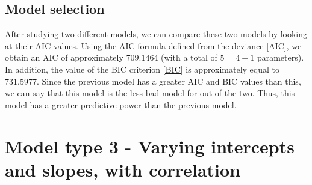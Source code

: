 \documentclass{article}
\begin{document}
\subsection{Model selection}
After studying two different models, we can compare these two models by looking at their AIC values.
Using the AIC formula defined from the deviance \eqref{AIC}, we obtain an AIC of approximately $709.1464$ (with a total of $5=4+1$ parameters). In addition, the value of the BIC criterion \eqref{BIC} is approximately equal to $731.5977$.
Since the previous model has a greater AIC and BIC values than this, we can say that this model is the less bad model for out of the two. Thus, this model has a greater predictive power than the previous model.



\section{Model type 3 - Varying intercepts and slopes, with correlation}
\end{document}
